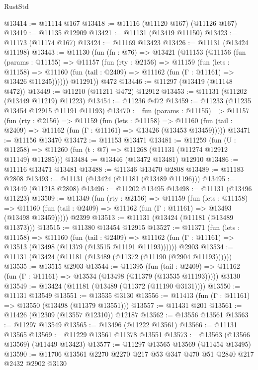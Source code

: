 \begin{lexlean}{RustStd}
\begin{coremodule}
@13414 := @11114 @167
@13418 := @11116 (@11120 @167) (@11126 @167)
@13419 := @11135 @12909
@13421 := @11131 (@13419 @11150)
@13423 := @11173 (@11174 @167)
@13424 := @11169 @13423
@13426 := @11131 (@13424 @11198)
@13443 := @11130
    (fun (fn : @76) =>
    @13421
      (@11153
        (@11156
          (fun (params : @11155) =>
          @11157
            (fun (rty : @2156) =>
            @11159
              (fun (lets : @11158) =>
              @11160 (fun (tail : @2409) => @11162 (fun (Γ : @11161) => @13426 @11245))))))
        @11291))
    @472
@13446 := @11297 (@13419 (@11148 @472))
@13449 := @11210 (@11211 @472) @12912
@13453 := @11131 (@11202 (@13449 @11219) @11223)
@13454 := @11236 @472
@13459 := @11233 (@11235 @13454 @12915 @11191 @11193)
@13470 := fun (params : @11155) =>
  @11157
    (fun (rty : @2156) =>
    @11159
      (fun (lets : @11158) =>
      @11160 (fun (tail : @2409) => @11162 (fun (Γ : @11161) => @13426 (@13453 @13459)))))
@13471 := @11156 @13470
@13472 := @11153 @13471
@13481 := @11259
    (fun (U : @11258) => @11260 (fun (t : @7) => @11268 (@11131 (@11274 @12912 @11149) @11285)))
@13484 := @13446 (@13472 @13481) @12910
@13486 := @11116 @13471 @13481
@13488 := @11346 @13470 @2808
@13489 := @11183 @2808
@13493 := @11131 (@13424 (@11181 (@13489 @11196)))
@13495 := @13449 (@11218 @2808)
@13496 := @11202 @13495
@13498 := @11131 (@13496 @11223)
@13509 := @11349
    (fun (rty : @2156) =>
    @11159
      (fun (lets : @11158) =>
      @11160 (fun (tail : @2409) => @11162 (fun (Γ : @11161) => @13493 (@13498 @13459)))))
    @2399
@13513 := @11131 (@13424 (@11181 (@13489 @11373)))
@13515 := @11380 @13454 @12915
@13527 := @11371
    (fun (lets : @11158) =>
    @11160
      (fun (tail : @2409) =>
      @11162 (fun (Γ : @11161) => @13513 (@13498 (@11379 (@13515 @11191 @11193))))))
    @2903
@13534 := @11131 (@13424 (@11181 (@13489 (@11372 (@11190 (@2904 @11193))))))
@13535 := @13515 @2903
@13544 := @11395
    (fun (tail : @2409) => @11162 (fun (Γ : @11161) => @13534 (@13498 (@11379 (@13535 @11193)))))
    @3130
@13549 := @13424 (@11181 (@13489 (@11372 (@11190 @3131))))
@13550 := @11131 @13549
@13551 := @13535 @3130
@13556 := @11413 (fun (Γ : @11161) => @13550 (@13498 (@11379 @13551)))
@13557 := @11431 @201
@13561 := @11426 (@12309 (@13557 @12310)) @12187
@13562 := @13556 @13561
@13563 := @11297 @13549
@13565 := @13496 (@11222 @13561)
@13566 := @11131 @13565
@13569 := @11229 @13561 @11378 @13551
@13573 := @13563 (@13566 @13569) (@11449 @13423)
@13577 := @11297 @13565 @13569 (@11454 @13495)
@13590 := @11706 @13561 @2270 @2270 @217 @53 @347 @470 @51 @2840 @217 @2432 @2902 @3130

\end{coremodule}
\end{lexlean}
